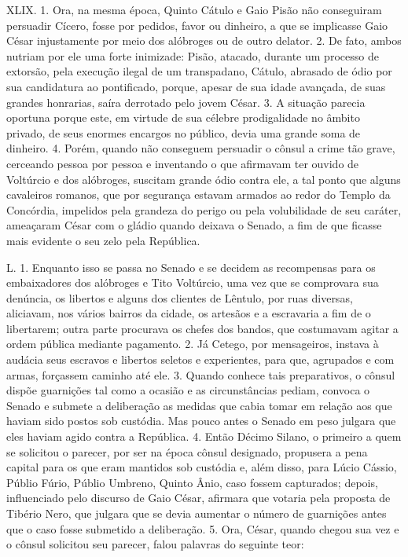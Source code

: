 XLIX. 1. Ora, na mesma época, Quinto Cátulo e Gaio Pisão não conseguiram
persuadir Cícero, fosse por pedidos, favor ou dinheiro, a que se implicasse
Gaio César injustamente por meio dos alóbroges ou de outro delator. 2. De fato,
ambos nutriam por ele uma forte inimizade: Pisão, atacado, durante um processo
de extorsão, pela execução ilegal de um transpadano, Cátulo, abrasado de ódio
por sua candidatura ao pontificado, porque, apesar de sua idade avançada, de
suas grandes honrarias, saíra derrotado pelo jovem César. 3. A situação parecia
oportuna porque este, em virtude de sua célebre prodigalidade no âmbito
privado, de seus enormes encargos no público, devia uma grande soma de
dinheiro. 4. Porém, quando não conseguem persuadir o cônsul a crime tão grave,
cerceando pessoa por pessoa e inventando o que afirmavam ter ouvido de
Voltúrcio e dos alóbroges, suscitam grande ódio contra ele, a tal ponto que
alguns cavaleiros romanos, que por segurança estavam armados ao redor do Templo
da Concórdia, impelidos pela grandeza do perigo ou pela volubilidade de seu caráter, ameaçaram César com o gládio quando deixava o Senado, a fim de que
ficasse mais evidente o seu zelo pela República. 

L. 1. Enquanto isso se passa no Senado e se decidem as recompensas para os
embaixadores dos alóbroges e Tito Voltúrcio, uma vez que se comprovara sua
denúncia, os libertos e alguns dos clientes de Lêntulo, por ruas diversas,
aliciavam, nos vários bairros da cidade, os artesãos e a escravaria a fim de o
libertarem; outra parte procurava os chefes dos bandos, que costumavam agitar a
ordem pública mediante pagamento. 2. Já Cetego, por mensageiros, instava à
audácia seus escravos e libertos seletos e experientes, para que, agrupados e
com armas, forçassem caminho até ele. 3. Quando conhece tais preparativos, o
cônsul dispõe guarnições tal como a ocasião e as circunstâncias pediam, convoca
o Senado e submete a deliberação as medidas que cabia tomar em relação aos que
haviam sido postos sob custódia. Mas pouco antes o Senado em peso julgara que
eles haviam agido contra a República. 4. Então Décimo Silano, o primeiro a quem
se solicitou o parecer, por ser na época cônsul designado, propusera a pena
capital para os que eram mantidos sob custódia e, além disso, para Lúcio
Cássio, Públio Fúrio, Públio Umbreno, Quinto Ânio, caso fossem capturados;
depois, influenciado pelo discurso de Gaio César, afirmara que votaria pela
proposta de Tibério Nero, que julgara que se devia aumentar o número de
guarnições antes que o caso fosse submetido a deliberação. 5. Ora, César,
quando chegou sua vez e o cônsul solicitou seu parecer, falou palavras do
seguinte teor:

